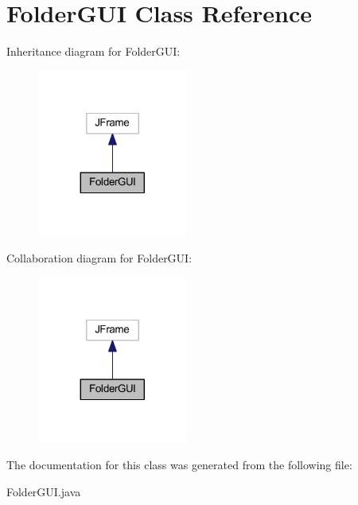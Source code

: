 \hypertarget{class_folder_g_u_i}{\section{Folder\-G\-U\-I Class Reference}
\label{class_folder_g_u_i}
}


Inheritance diagram for Folder\-G\-U\-I\-:
\nopagebreak
\begin{figure}[H]
\begin{center}
\leavevmode
\includegraphics[width=140pt]{class_folder_g_u_i__inherit__graph}
\end{center}
\end{figure}


Collaboration diagram for Folder\-G\-U\-I\-:
\nopagebreak
\begin{figure}[H]
\begin{center}
\leavevmode
\includegraphics[width=140pt]{class_folder_g_u_i__coll__graph}
\end{center}
\end{figure}


The documentation for this class was generated from the following file\-:\begin{DoxyCompactItemize}
\item 
Folder\-G\-U\-I.\-java\end{DoxyCompactItemize}

